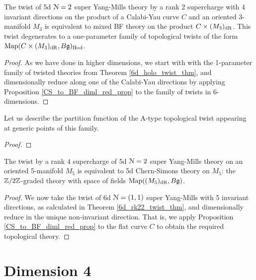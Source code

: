 \documentclass[10pt, oneside]{article}
\begin{document}
\begin{theorem} \label{5d_rk2_twist_thm}
The twist of 5d $\mathcal{N}=2$ super Yang-Mills theory by a rank $2$ supercharge with 4 invariant directions on the product of a Calabi-Yau curve $C$ and an oriented 3-manifold $M_3$ is equivalent to mixed BF theory on the product $C \times (M_3)_{\mathrm{dR}}$. This twist degenerates to a one-parameter family of topological twists of the form $\operatorname{Map}(C \times (M_3)_{\mathrm{dR}}, B\mathfrak{g})_{\mathrm{Hod}}$.
\end{theorem}

\begin{proof}
As we have done in higher dimensions, we start with with the 1-parameter family of twisted theories from Theorem \ref{6d_holo_twist_thm}, and dimensionally reduce along one of the Calabi-Yau directions by applying Proposition \ref{CS_to_BF_diml_red_prop} to the family of twists in 6-dimensions.
\end{proof}

Let us describe the partition function of the A-type topological twist appearing at generic points of this family.  
\begin{theorem}
\end{theorem}

\begin{proof}
 
\end{proof}

\begin{theorem} \label{5d_rk4_twist_thm}
The twist by a rank $4$ supercharge of 5d $\mathcal{N}=2$ super Yang-Mills theory on an oriented 5-manifold $M_5$ is equivalent to 5d Chern-Simons theory on $M_5$: the $\mathbb Z/2\mathbb Z$-graded theory with space of fields $\mathrm{Map}((M_5)_{\mathrm{dR}}, B\mathfrak{g})$.
\end{theorem}

\begin{proof}
We now take the twist of 6d $\mathcal{N}=(1,1)$ super Yang-Mills with 5 invariant directions, as calculated in Theorem \ref{6d_rk22_twist_thm}, and dimensionally reduce in the unique non-invariant direction.  That is, we apply Proposition \ref{CS_to_BF_diml_red_prop} to the flat curve $C$ to obtain the required topological theory.
\end{proof}
 
\section{Dimension 4}
\end{document}
